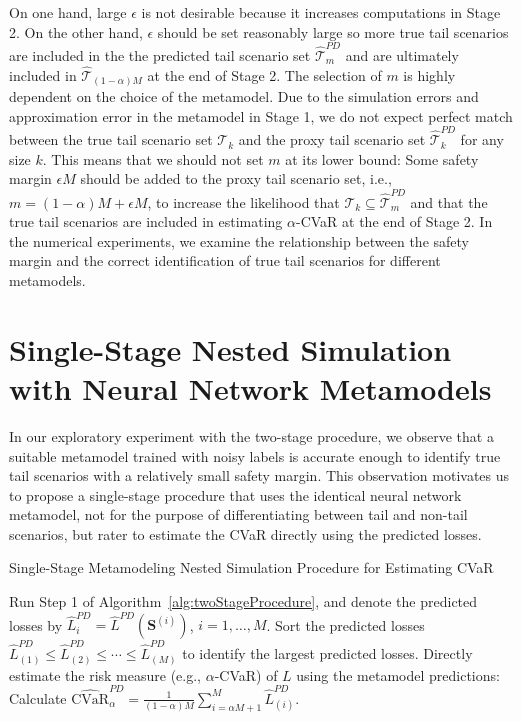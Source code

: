 \documentclass{article}
\newcommand{\CVaR}{\mbox{CVaR}}
\newcommand{\tail}{\mathcal{T}}
\newcommand{\bS}{\bm{S}}
\newcommand{\Lhat}{\widehat{L}}
\begin{document}
On one hand, large $\epsilon$ is not desirable because it increases computations in Stage 2.
On the other hand, $\epsilon$ should be set reasonably large so more true tail scenarios are included in the the predicted tail scenario set $\widehat{\tail}_{m}^{PD}$ and are ultimately included in $\widehat{\tail}_{(1-\alpha )M}$ at the end of Stage 2.
The selection of $m$ is highly dependent on the choice of the metamodel.
Due to the simulation errors and approximation error in the metamodel in Stage 1, we do not expect perfect match between the true tail scenario set $\tail_{k}$ and the proxy tail scenario set $\widehat{\tail}_{k}^{PD}$ for any size $k$.
This means that we should not set $m$ at its lower bound: Some safety margin $\epsilon M$ should be added to the proxy tail scenario set, i.e., $m = (1-\alpha )M + \epsilon M$, to increase the likelihood that $\tail_{k} \subseteq \widehat{\tail}_{m}^{PD}$ and that the true tail scenarios are included in estimating $\alpha$-CVaR at the end of Stage 2.
In the numerical experiments, we examine the relationship between the safety margin and the correct identification of true tail scenarios for different metamodels.

\section{Single-Stage Nested Simulation with Neural Network Metamodels} \label{sec:metamodel1Stage}

In our exploratory experiment with the two-stage procedure, we observe that a suitable metamodel trained with noisy labels is accurate enough to identify true tail scenarios with a relatively small safety margin.
This observation motivates us to propose a single-stage procedure that uses the identical neural network metamodel, not for the purpose of differentiating between tail and non-tail scenarios, but rater to estimate the CVaR directly using the predicted losses. 

\begin{algorithm}
\caption{Single-Stage Metamodeling Nested Simulation Procedure for Estimating CVaR}
\begin{algorithmic}[1] \label{alg:oneStageProcedure}
    \STATE Run Step 1 of Algorithm~\ref{alg:twoStageProcedure}, and denote the predicted losses by
    $\Lhat^{PD}_i = \Lhat^{PD}(\bS^{(i)})$, $i=1,\ldots,M$.
    \STATE Sort the predicted losses $\Lhat^{PD}_{(1)}\leq \Lhat^{PD}_{(2)} \leq \cdots\leq \Lhat^{PD}_{(M)}$ to identify the largest predicted losses. 
    \STATE Directly estimate the risk measure (e.g., $\alpha$-CVaR) of $L$ using the metamodel predictions: Calculate $\widehat{\CVaR}^{PD}_\alpha = \frac{1}{(1-\alpha)M} \sum_{i=\alpha M + 1}^{M}\Lhat^{PD}_{(i)}$.
\end{algorithmic}
\end{algorithm}
\end{document}

